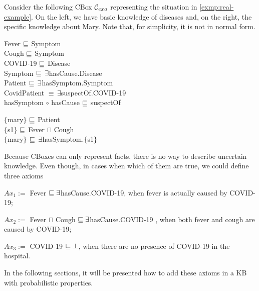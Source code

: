 \begin{example}
	\label{exmp:el-cbox-def}
	Consider the following CBox $\mathcal{C}_{exa}$ representing the situation in \autoref{exmp:real-example}. On the left, we have basic knowledge of diseases and, on the right, the specific knowledge about Mary. Note that, for simplicity, it is not in normal form.

		{
			\sffamily
			\begin{center}
				\begin{minipage}{0,4\textwidth}
					\fontsize{10}{14}
					\selectfont
					Fever $\sqsubseteq$ Symptom\\
					Cough $\sqsubseteq$ Symptom\\
					COVID-19 $\sqsubseteq$ Disease\\
					Symptom $\sqsubseteq \, \exists$hasCause.Disease\\
					Patient $\sqsubseteq\, \exists$hasSymptom.Symptom\\
					CovidPatient $\equiv\, \exists$suspectOf.COVID-19\\
					hasSymptom $\circ$ hasCause $\sqsubseteq$ suspectOf\\
				\end{minipage}
				\hspace{10pt}
				\begin{minipage}{0,4\textwidth}
					\fontsize{10}{14}
					\selectfont
					$\{$mary$\}$ $\sqsubseteq$ Patient\\
					$\{$s1$\}$ $\sqsubseteq$ Fever $\sqcap$ Cough\\
					$\{$mary$\}$ $\sqsubseteq \, \exists$hasSymptom.$\{$s1$\}$\\
				\end{minipage}
			\end{center}
		}

	Because CBoxes can only represent facts, there is no way to describe uncertain knowledge. Even though, in cases when which of them are true, we could define three axioms

	\begin{description}
		\item { \sffamily $Ax_1 := $ Fever $\sqsubseteq \exists$hasCause.COVID-19}, when fever is actually caused by COVID-19;
		\item { \sffamily $Ax_2 :=$ Fever $\sqcap$ Cough $\sqsubseteq \exists$hasCause.COVID-19 }, when both fever and cough are caused by COVID-19;
		\item { \sffamily $Ax_3 :=$ COVID-19 $\sqsubseteq \bot$}, when there are no presence of COVID-19 in the hospital.
	\end{description}

	In the following sections, it will be presented how to add these axioms in a KB with probabilistic properties.
\end{example}

